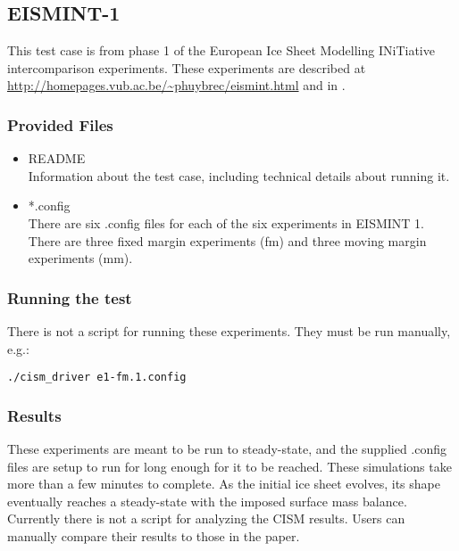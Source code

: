 \FloatBarrier


\subsection{EISMINT-1}
\label{sec:eismint_description}
This test case is from phase 1 of the European Ice Sheet Modelling INiTiative intercomparison experiments.  These experiments are described at \url{http://homepages.vub.ac.be/~phuybrec/eismint.html} and in \citet{Huybrechts1996}.

\subsubsection{Provided Files}
\label{subsec:eismint_files}

\begin{itemize}
	\item README \\
		Information about the test case, including technical details about running it.
\item *.config \\
  There are six .config files for each of the six experiments in EISMINT 1.  There are three fixed margin experiments (fm) and three moving margin experiments (mm).
\end{itemize}

\subsubsection{Running the test}
There is not a script for running these experiments.  They must be run manually, e.g.: 

\texttt{./cism\_driver e1-fm.1.config}


\subsubsection{Results}
\label{subsecc:eismint_results}
These experiments are meant to be run to steady-state, and the supplied .config files are setup to run for long enough for it to be reached.
These simulations take more than a few minutes to complete.
As the initial ice sheet evolves, its shape eventually reaches a steady-state with the imposed surface mass balance.  Currently there is not a script for analyzing the CISM results.  Users can manually compare their results to those in the \citet{Huybrechts1996} paper.


